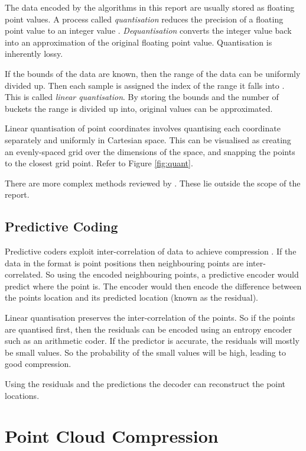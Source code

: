 \documentclass[a4paper]{report}
\begin{document}
The data encoded by the algorithms in this report are usually stored as
floating point values. A process called \emph{quantisation} reduces the
precision of a floating point value to an integer value
\citep{ag-racm-03}. \emph{Dequantisation} converts the integer value back into
an approximation of the original floating point value. Quantisation is
inherently lossy.

If the bounds of the data are known, then the range of the data can be
uniformly divided up. Then each sample is assigned the index of the range it
falls into \citep{drozdek}. This is called \emph{linear quantisation}. By
storing the bounds and the number of buckets the range is divided up into,
original values can be approximated.

Linear quantisation of point coordinates involves quantising each coordinate
separately and uniformly in Cartesian space. This can be visualised as
creating an evenly-spaced grid over the dimensions of the space, and snapping
the points to the closest grid point. Refer to Figure \ref{fig:quant}.

There are more complex methods reviewed by \citet{ag-racm-03}. These lie
outside the scope of the report.


\subsection{Predictive Coding}

Predictive coders exploit inter-correlation of data to achieve compression
\citep{drozdek}. If the data in the format is point positions then
neighbouring points are inter-correlated. So using the encoded neighbouring
points, a predictive encoder would predict where the point is. The encoder
would then encode the difference between the points location and its predicted
location (known as the residual).

Linear quantisation preserves the inter-correlation of the points. So if the
points are quantised first, then the residuals can be encoded using an entropy
encoder such as an arithmetic coder. If the predictor is accurate, the
residuals will mostly be small values. So the probability of the small values
will be high, leading to good compression.

Using the residuals and the predictions the decoder can reconstruct the point
locations.


\section{Point Cloud Compression}
\end{document}
